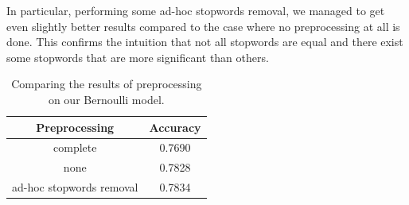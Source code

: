 In particular, performing some ad-hoc stopwords removal, we managed to get even slightly better results compared to the case where no preprocessing at all is done. This confirms the intuition that not all stopwords are equal and there exist some stopwords that are more significant than others.

\begin{table}[h!t]
    \centering
    \caption{Comparing the results of preprocessing on our Bernoulli model.}
    \label{tab:versus_metrics}
    \begin{tabular}{c|c}
        \hline
        Preprocessing & Accuracy \\
        \hline 
        complete & 0.7690 \\ 
        none & 0.7828 \\ 
        ad-hoc stopwords removal & 0.7834 \\ 
        \hline
    \end{tabular}
\end{table}
